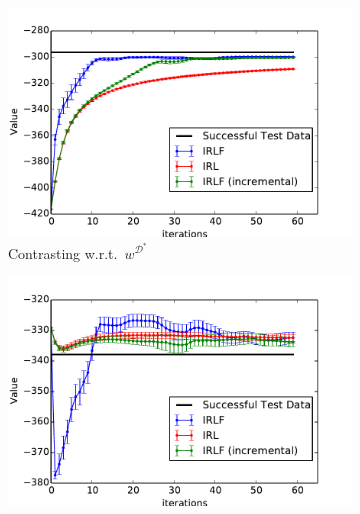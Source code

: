 \documentclass[letterpaper]{article}
\begin{document}
\begin{figure}[t]
  \centering
  \begin{subfigure}[b]{0.475\columnwidth}
    \includegraphics[trim=0.5cm 0.5cm 0.5cm 0,clip=true,width=\textwidth]{images/expert_apprentice_contrastive.pdf}
    
    \caption{Contrasting w.r.t.\ $w^{\mathcal{D}^*}$}
    \label{fig:toy_expert_apprentice_contrastive}
  \end{subfigure}
  \hfill
  \begin{subfigure}[b]{0.475\columnwidth}
    \includegraphics[trim=0.5cm 0.5cm 0.5cm 0,clip=true,width=\textwidth]{images/taboo_apprentice_contrastive.pdf}
    

\end{subfigure}
\end{figure}
\end{document}
